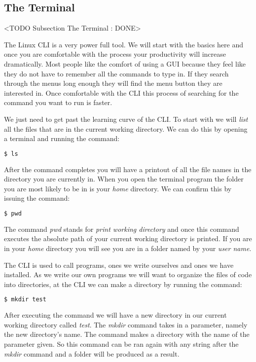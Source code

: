 \subsection{The Terminal}
	<TODO Subsection The Terminal : DONE>
	
The Linux \ac{CLI} is a very power full tool. We will start with the basics here and once you are comfortable with the process your productivity will increase dramatically. Most people like the comfort of using a \ac{GUI} because they feel like they do not have to remember all the commands to type in. If they search through the menus long enough they will find the menu button they are interested in. Once comfortable with the \ac{CLI} this process of searching for the command you want to run is faster. 

We just need to get past the learning curve of the \ac{CLI}. To start with we will \emph{list} all the files that are in the current working directory. We can do this by opening a terminal and running the command:

\begin{lstlisting}[language=bash]
    $ ls
\end{lstlisting}	
	
After the command completes you will have a printout of all the file names in the directory you are currently in. When you open the terminal program the folder you are most likely to be in is your \emph{home} directory. We can confirm this by issuing the command:

\begin{lstlisting}[language=bash]
    $ pwd
\end{lstlisting}	

The command \emph{pwd} stands for \emph{print working directory} and once this command executes the absolute path of your current working directory is printed. If you are in your \emph{home} directory you will see you are in a folder named by your \emph{user name}. 	
	
The \ac{CLI} is used to call programs, ones we write ourselves and ones we have installed. As we write our own programs we will want to organize the files of code into directories, at the \ac{CLI} we can make a directory by running the command:

\begin{lstlisting}[language=bash] 
    $ mkdir test
\end{lstlisting}	

After executing the command we will have a new directory in our current working directory called \emph{test}. The \emph{mkdir} command takes in a parameter, namely the new directory's name. The command makes a directory with the name of the parameter given. So this command can be ran again with any string after the \emph{mkdir} command and a folder will be produced as a result. 

